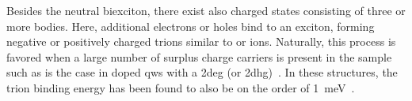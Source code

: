 Besides the neutral biexciton, there exist also charged states consisting of three or more bodies.
Here, additional electrons or holes bind to an exciton, forming negative or positively charged trions similar to  or  ions.
Naturally, this process is favored when a large number of surplus charge carriers is present in the sample such as is the case in doped \glspl{qw} with a \gls{2deg} (or \gls{2dhg})~\cite{Finkelstein1995}.
In these structures, the trion binding energy has been found to also be on the order of \qty{1}{\milli\electronvolt}~\cite{Esser2000,Bar-Joseph2005}.